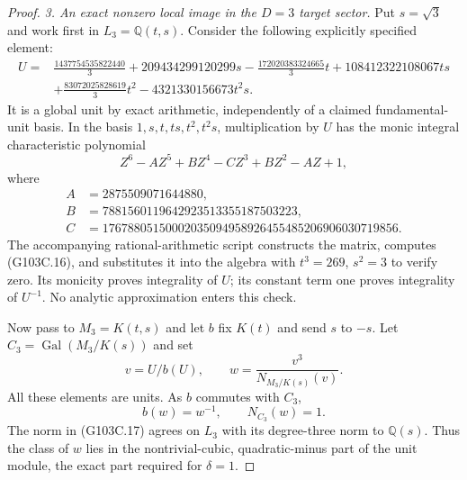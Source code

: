 \begin{proof}
\emph{3. An exact nonzero local image in the $D=3$ target sector.}
Put $s=\sqrt3$ and work first in $L_3=\mathbb Q(t,s)$.
Consider the following explicitly specified element:
\[
\begin{split}
 U={}&\frac{1437754535822440}{3}+209434299120299s
       -\frac{172020383324665}{3}t+108412322108067ts\\
    &+\frac{83072025828619}{3}t^2-4321330156673t^2s.
\end{split}                                           \tag{G103C.15}
\]
It is a global unit by exact arithmetic, independently of a claimed
fundamental-unit basis.  In the basis $1,s,t,ts,t^2,t^2s$, multiplication
by $U$ has the monic integral characteristic polynomial
\[
         Z^6-AZ^5+BZ^4-CZ^3+BZ^2-AZ+1,
                                                        \tag{G103C.16}
\]
where
\[
\begin{split}
 A&=2875509071644880,\\
 B&=7881560119642923513355187503223,\\
 C&=17678805150002035094958926455485206906030719856.
\end{split}
\]
The accompanying rational-arithmetic script constructs the matrix,
computes (G103C.16), and substitutes it into the algebra with
$t^3=269$, $s^2=3$ to verify zero.
Its monicity proves integrality of $U$; its constant term one proves
integrality of $U^{-1}$.  No analytic approximation enters this check.

Now pass to $M_3=K(t,s)$ and let $b$ fix $K(t)$ and send $s$ to $-s$.
Let $C_3=\operatorname{Gal}(M_3/K(s))$ and set
\[
                 v=U/b(U),\qquad
                 w=\frac{v^3}{N_{M_3/K(s)}(v)}.
                                                        \tag{G103C.17}
\]
All these elements are units.  As $b$ commutes with $C_3$,
\[
                      b(w)=w^{-1},\qquad N_{C_3}(w)=1.
                                                        \tag{G103C.18}
\]
The norm in (G103C.17) agrees on $L_3$ with its degree-three norm
to $\mathbb Q(s)$.
Thus the class of $w$ lies in the nontrivial-cubic, quadratic-minus
part of the unit module, the exact part required for $\delta=1$.


\end{proof}
